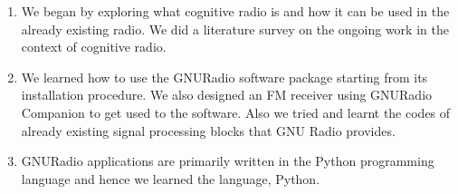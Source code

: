 \begin{enumerate}

\item We began by exploring what cognitive radio is and how it can be used 
in the already existing radio. We did a literature survey on the ongoing work in the
context of cognitive radio.

\item We learned how to use the GNURadio software package starting from its installation procedure. We 
also designed an FM receiver using GNURadio Companion to get used to the software. 
Also we tried and learnt the codes of already existing signal processing blocks 
that GNU Radio provides.

\item GNURadio applications are primarily written in the Python programming 
language and hence we learned the language, Python.


\end{enumerate}
